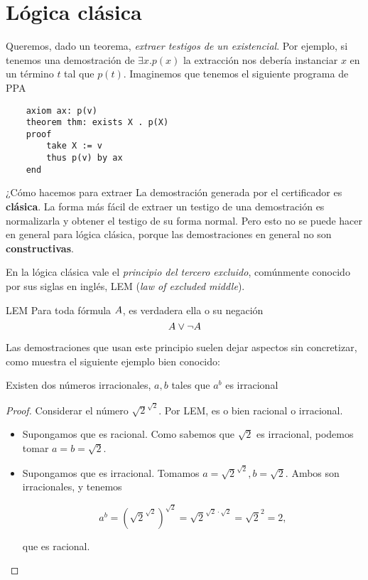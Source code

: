 \section{Lógica clásica}
Queremos, dado un teorema, \textit{extraer testigos de un existencial}. Por
ejemplo, si tenemos una demostración de $\exists x . p(x)$ la extracción nos
debería instanciar $x$ en un término $t$ tal que $p(t)$. Imaginemos que tenemos
el siguiente programa de PPA

\begin{verbatim}
    axiom ax: p(v)
    theorem thm: exists X . p(X)
    proof
        take X := v
        thus p(v) by ax
    end
\end{verbatim}

¿Cómo hacemos para extraer La demostración generada por el certificador es \textbf{clásica}. La forma más
fácil de extraer un testigo de una demostración es normalizarla y obtener el
testigo de su forma normal. Pero esto no se puede hacer en general para lógica
clásica, porque las demostraciones en general no son \textbf{constructivas}.

En la lógica clásica vale el \textit{principio del tercero excluido}, comúnmente
conocido por sus siglas en inglés, LEM (\textit{law of excluded middle}).

\begin{prop}{LEM} Para toda fórmula $A$, es verdadera ella o su negación
    \[ A \vee \neg A \]
\end{prop}

Las demostraciones que usan este principio suelen dejar aspectos sin
concretizar, como muestra el siguiente ejemplo bien conocido:

\begin{theorem}\label{thm:irrat}
    Existen dos números irracionales, $a, b$ tales que $a^b$ es irracional
\end{theorem}
\begin{proof}
    Considerar el número $\sqrt{2}^{\sqrt{2}}$. Por LEM, es o bien racional o
    irracional.
    \begin{itemize}
        \item Supongamos que es racional. Como sabemos que $\sqrt{2}$ es
        irracional, podemos tomar $a=b=\sqrt{2}$.
        \item Supongamos que es irracional. Tomamos $a = \sqrt{2}^{\sqrt{2}}, b
        = \sqrt{2}$. Ambos son irracionales, y tenemos

        \[
            a^b
            = \left( \sqrt{2}^{\sqrt{2}} \right)^{\sqrt{2}}
            = \sqrt{2}^{\sqrt{2} \cdot \sqrt{2}}
            = \sqrt{2}^{2}
            = 2,
        \]

        que es racional.
    \end{itemize}
\end{proof}

